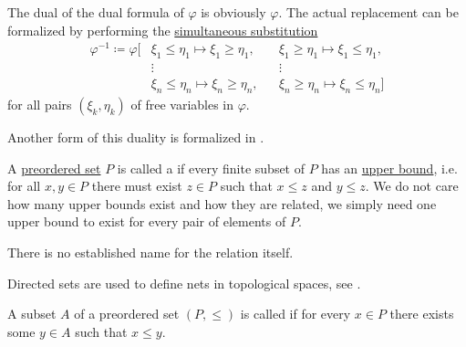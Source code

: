 \begin{definition}
\begin{thmenum}
    The dual of the dual formula of \( \varphi \) is obviously \( \varphi \). The actual replacement can be formalized by performing the \hyperref[def:first_order_substitution/term_in_formula]{simultaneous substitution}
    \begin{equation*}
      \begin{aligned}
        \varphi^{-1} \coloneqq \varphi[
          &\xi_1 \leq \eta_1 \mapsto \xi_1 \geq \eta_1, &&\xi_1 \geq \eta_1 \mapsto \xi_1 \leq \eta_1, \\
          &\vdots                                       &&\vdots \\
          &\xi_n \leq \eta_n \mapsto \xi_n \geq \eta_n, &&\xi_n \geq \eta_n \mapsto \xi_n \leq \eta_n]
      \end{aligned}
    \end{equation*}
    for all pairs \( (\xi_k, \eta_k) \) of free variables in \( \varphi \).

    Another form of this duality is formalized in .
  \end{thmenum}
\end{definition}

\begin{definition}\label{def:directed_set}
  A \hyperref[def:preordered_set]{preordered set} \( P \) is called a  if every finite subset of \( P \) has an \hyperref[def:partially_ordered_set_extremal_points/upper_and_lower_bounds]{upper bound}, i.e. for all \( x, y \in P \) there must exist \( z \in P \) such that \( x \leq z \) and \( y \leq z \). We do not care how many upper bounds exist and how they are related, we simply need one upper bound to exist for every pair of elements of \( P \).

  There is no established name for the relation itself.

  Directed sets are used to define nets in topological spaces, see .
\end{definition}

\begin{definition}\label{def:cofinal_set}
  A subset \( A \) of a preordered set \( (P, \leq) \) is called  if for every \( x \in P \) there exists some \( y \in A \) such that \( x \leq y \).
\end{definition}

